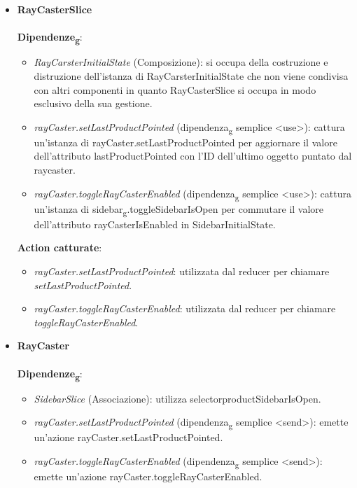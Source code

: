 \begin{itemize}
\begin{itemize}
		\end{itemize}
		\item \textbf{RayCasterSlice}
		\\\\
		\textbf{Dipendenze\textsubscript{g}}:
		\begin{itemize}
			\item \textit{RayCarsterInitialState} (Composizione): si occupa della costruzione e distruzione dell'istanza di RayCarsterInitialState
			che non viene condivisa con altri componenti in quanto RayCasterSlice si occupa in modo esclusivo della sua gestione.
			\item \textit{rayCaster.setLastProductPointed} (dipendenza\textsubscript{g} semplice \textless use\textgreater): cattura un'istanza di rayCaster.setLastProductPointed
			per aggiornare il valore dell'attributo lastProductPointed con l'ID dell'ultimo oggetto puntato dal raycaster. 
			\item \textit{rayCaster.toggleRayCasterEnabled} (dipendenza\textsubscript{g} semplice \textless use\textgreater): cattura un'istanza di sidebar\textsubscript{g}.toggleSidebarIsOpen
			per commutare il valore dell'attributo rayCasterIsEnabled in SidebarInitialState. 
		\end{itemize}
		\textbf{Action catturate}:
		\begin{itemize}
			\item \textit{rayCaster.setLastProductPointed}: utilizzata dal reducer per chiamare \textit{setLastProductPointed}.
			\item \textit{rayCaster.toggleRayCasterEnabled}: utilizzata dal reducer per chiamare \textit{toggleRayCasterEnabled}.
		\end{itemize}
		\item \textbf{RayCaster}
		\\\\
		\textbf{Dipendenze\textsubscript{g}}:
		\begin{itemize}
			\item \textit{SidebarSlice} (Associazione): utilizza selectorproductSidebarIsOpen.
			\item \textit{rayCaster.setLastProductPointed} (dipendenza\textsubscript{g} semplice \textless send\textgreater): emette un'azione
			rayCaster.setLastProductPointed.
			\item \textit{rayCaster.toggleRayCasterEnabled} (dipendenza\textsubscript{g} semplice \textless send\textgreater): emette un'azione
			rayCaster.toggleRayCasterEnabled.
		\end{itemize}

\end{itemize}
